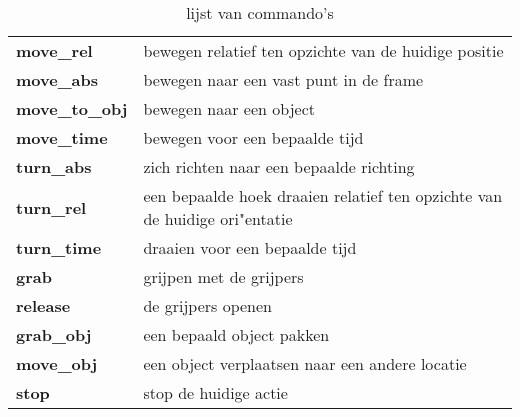 \begin{table}[h]
\centering
\begin{tabular}{| l | l |}
\hline
\textbf{move\_rel} &  bewegen relatief ten opzichte van de huidige positie\\
\textbf{move\_abs} & bewegen naar een vast punt in de frame\\
\textbf{move\_to\_obj} & bewegen naar een object\\
\textbf{move\_time} & bewegen voor een bepaalde tijd\\
\textbf{turn\_abs} & zich richten naar een bepaalde richting\\
\textbf{turn\_rel} & een bepaalde hoek draaien relatief ten opzichte van de huidige ori"entatie\\
\textbf{turn\_time} & draaien voor een bepaalde tijd\\
\textbf{grab} & grijpen met de grijpers\\
\textbf{release} & de grijpers openen\\
\textbf{grab\_obj} & een bepaald object pakken\\
\textbf{move\_obj} & een object verplaatsen naar een andere locatie\\
\textbf{stop} & stop de huidige actie\\
\hline
\end{tabular}
\caption{lijst van commando's}
\label{commands}
\end{table}


